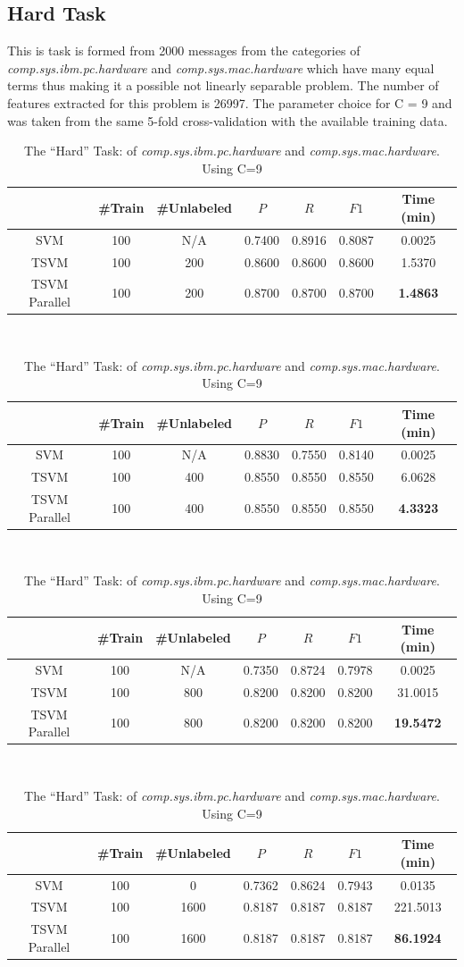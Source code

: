 \subsection{Hard Task}

This is task is formed from 2000 messages from the categories of \emph{comp.sys.ibm.pc.hardware}
and\emph{ comp.sys.mac.hardware} which have many equal terms thus
making it a possible not linearly separable problem. The number of
features extracted for this problem is 26997. The parameter choice
for C = 9 and was taken from the same 5-fold cross-validation with
the available training data.

%
\begin{table}
\begin{longtable}
\begin{tabular}{|c|c|c|c|c|c||c|}
\hline
 & \#Train & \#Unlabeled & $P$  & $R$  & $F1$  & Time (min)\tabularnewline
\hline 
SVM & 100 & N/A & 0.7400 & 0.8916 & 0.8087 & 0.0025\tabularnewline
\hline 
TSVM & 100 & 200 & 0.8600 & 0.8600 & 0.8600 & 1.5370\tabularnewline
\hline 
TSVM Parallel & 100 & 200 & 0.8700 & 0.8700 & 0.8700 & \textbf{1.4863}\tabularnewline
\hline
\end{tabular} \\
\tabularnewline
\tabularnewline
\begin{tabular}{|c|c|c|c|c|c||c|}
\hline 
 & \#Train & \#Unlabeled & $P$  & $R$  & $F1$  & Time (min)\tabularnewline
\hline 
SVM & 100 & N/A & 0.8830 & 0.7550 & 0.8140 & 0.0025\tabularnewline
\hline 
TSVM & 100 & 400 & 0.8550 & 0.8550 & 0.8550 & 6.0628\tabularnewline
\hline 
TSVM Parallel & 100 & 400 & 0.8550 & 0.8550 & 0.8550 & \textbf{4.3323}\tabularnewline
\hline
\end{tabular} \\
\tabularnewline
\tabularnewline
\begin{tabular}{|c|c|c|c|c|c||c|}
\hline 
 & \#Train & \#Unlabeled & $P$  & $R$  & $F1$  & Time (min)\tabularnewline
\hline
\hline 
SVM & 100 & N/A & 0.7350 & 0.8724 & 0.7978 & 0.0025\tabularnewline
\hline 
TSVM & 100 & 800 & 0.8200 & 0.8200 & 0.8200 & 31.0015\tabularnewline
\hline 
TSVM Parallel & 100 & 800 & 0.8200 & 0.8200 & 0.8200 & \textbf{19.5472}\tabularnewline
\hline
\end{tabular} \\
\tabularnewline
\tabularnewline
\begin{tabular}{|c|c|c|c|c|c||c|}
\hline 
 & \#Train & \#Unlabeled & $P$  & $R$  & $F1$  & Time (min)\tabularnewline
\hline
\hline 
SVM & 100 & 0 & 0.7362 & 0.8624 & 0.7943 & 0.0135\tabularnewline
\hline 
TSVM & 100 & 1600 & 0.8187 & 0.8187 & 0.8187 & 221.5013\tabularnewline
\hline 
TSVM Parallel & 100 & 1600 & 0.8187 & 0.8187 & 0.8187 & \textbf{86.1924}\tabularnewline
\hline
\end{tabular}\tabularnewline
\tabularnewline
\tabularnewline
\tabularnewline
\end{longtable}

\caption{The {}``Hard'' Task:\emph{ }of \emph{comp.sys.ibm.pc.hardware} and\emph{
comp.sys.mac.hardware}. Using C=9 \label{tab:Hard-Task:comp.graphics-and} }

\end{table}


